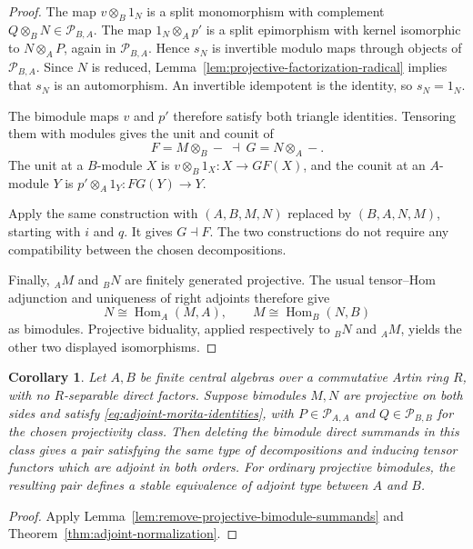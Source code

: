 \documentclass[12pt,a4paper,english,reqno]{amsart}
\numberwithin{equation}{section}
\theoremstyle{plain}
\newtheorem{corollary}[theorem]{Corollary}
\theoremstyle{definition}
\begin{document}
\begin{proof}
The map $v\otimes_B1_N$ is a split monomorphism with complement
$Q\otimes_BN\in\mathcal P_{B,A}$.  The map
$1_N\otimes_Ap'$ is a split epimorphism with kernel isomorphic to
$N\otimes_AP$, again in $\mathcal P_{B,A}$.  Hence $s_N$ is
invertible modulo maps through objects of $\mathcal P_{B,A}$.
Since $N$ is reduced, Lemma~\ref{lem:projective-factorization-radical}
implies that $s_N$ is an automorphism.  An invertible idempotent is
the identity, so $s_N=1_N$.

The bimodule maps $v$ and $p'$ therefore satisfy both triangle
identities.  Tensoring them with modules gives the unit
and counit of
\[
 F=M\otimes_B-\ \dashv\ G=N\otimes_A-.
\]
The unit at a $B$-module $X$ is
$v\otimes_B1_X:X\to GF(X)$, and the counit at an $A$-module $Y$
is $p'\otimes_A1_Y:FG(Y)\to Y$.

Apply the same construction with $(A,B,M,N)$ replaced by
$(B,A,N,M)$, starting with $i$ and $q$.  It gives $G\dashv F$.
The two constructions do not require any compatibility between the
chosen decompositions.

Finally, ${}_AM$ and ${}_BN$ are finitely generated projective.
The usual tensor--Hom adjunction and uniqueness of right adjoints
therefore give
\[
 N\cong\operatorname{Hom}_A(M,A),
 \qquad M\cong\operatorname{Hom}_B(N,B)
\]
as bimodules.  Projective biduality, applied respectively to
${}_BN$ and ${}_AM$, yields the other two displayed isomorphisms.
\end{proof}

\begin{corollary}
\label{cor:adjoint-type-without-separable-factors}
Let $A,B$ be finite central algebras over a commutative Artin ring
$R$, with no $R$-separable direct factors.  Suppose bimodules $M,N$
are projective on both sides and satisfy
\eqref{eq:adjoint-morita-identities}, with
$P\in\mathcal P_{A,A}$ and $Q\in\mathcal P_{B,B}$ for the chosen
projectivity class.  Then deleting the bimodule direct summands
in this class gives a pair satisfying the same type of
decompositions and inducing tensor functors which are adjoint in both
orders.  For ordinary projective bimodules, the resulting pair defines
a stable equivalence of adjoint type between $A$ and $B$.
\end{corollary}

\begin{proof}
Apply Lemma~\ref{lem:remove-projective-bimodule-summands} and
Theorem~\ref{thm:adjoint-normalization}.
\end{proof}
\end{document}
